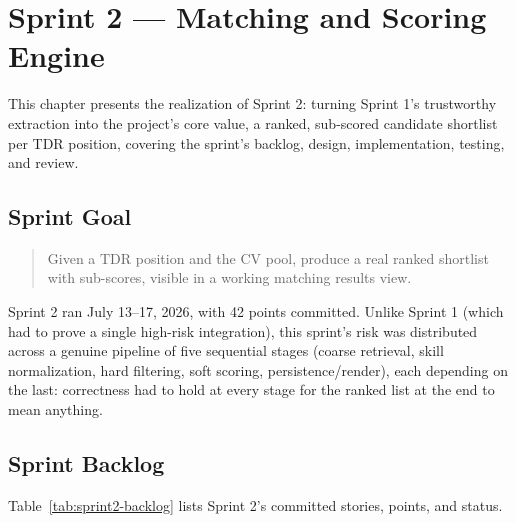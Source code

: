 \chapter{Sprint 2 --- Matching and Scoring Engine}
\label{chap:sprint-2}

This chapter presents the realization of Sprint 2: turning Sprint 1's
trustworthy extraction into the project's core value, a ranked,
sub-scored candidate shortlist per TDR position, covering the sprint's
backlog, design, implementation, testing, and review.

\section{Sprint Goal}

\begin{quote}
Given a TDR position and the CV pool, produce a real ranked shortlist
with sub-scores, visible in a working matching results view.
\end{quote}

Sprint 2 ran July 13--17, 2026, with 42 points committed. Unlike Sprint 1
(which had to prove a single high-risk integration), this sprint's risk
was distributed across a genuine pipeline of five sequential stages
(coarse retrieval, skill normalization, hard filtering, soft scoring,
persistence/render), each depending on the last: correctness had to
hold at every stage for the ranked list at the end to mean anything.

\section{Sprint Backlog}

Table~\ref{tab:sprint2-backlog} lists Sprint 2's committed stories, points, and status.

